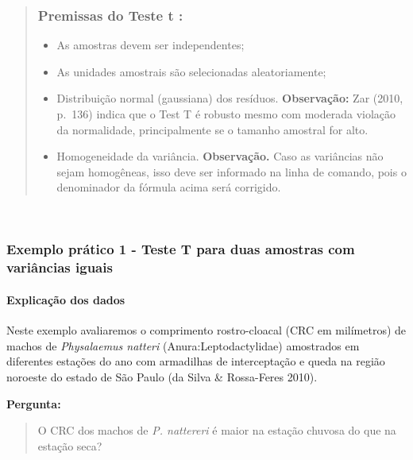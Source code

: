 \documentclass[
]{book}
\providecommand{\tightlist}{%
  \setlength{\itemsep}{0pt}\setlength{\parskip}{0pt}}
\begin{document}
\begin{quote}
\hypertarget{premissas-do-teste-t}{%
\subsubsection{Premissas do Teste t :}\label{premissas-do-teste-t}}

\begin{itemize}
\tightlist
\item
  As amostras devem ser independentes;
\item
  As unidades amostrais são selecionadas aleatoriamente;
\item
  Distribuição normal (gaussiana) dos resíduos. \textbf{Observação:} Zar (2010, p.~136) indica que o Test T é robusto mesmo com moderada violação da normalidade, principalmente se o tamanho amostral for alto.
\item
  Homogeneidade da variância. \textbf{Observação.} Caso as variâncias não sejam homogêneas, isso deve ser informado na linha de comando, pois o denominador da fórmula acima será corrigido.
\end{itemize}
\end{quote}

~

\hypertarget{exemplo-pruxe1tico-1---teste-t-para-duas-amostras-com-variuxe2ncias-iguais}{%
\subsubsection{Exemplo prático 1 - Teste T para duas amostras com variâncias iguais}\label{exemplo-pruxe1tico-1---teste-t-para-duas-amostras-com-variuxe2ncias-iguais}}

\hypertarget{explicauxe7uxe3o-dos-dados}{%
\paragraph{Explicação dos dados}\label{explicauxe7uxe3o-dos-dados}}

Neste exemplo avaliaremos o comprimento rostro-cloacal (CRC em milímetros) de machos de \emph{Physalaemus natteri} (Anura:Leptodactylidae) amostrados em diferentes estações do ano com armadilhas de interceptação e queda na região noroeste do estado de São Paulo (da Silva \& Rossa-Feres 2010).

\textbf{Pergunta:}

\begin{quote}
O CRC dos machos de \emph{P. nattereri} é maior na estação chuvosa do que na estação seca?
\end{quote}
\end{document}
